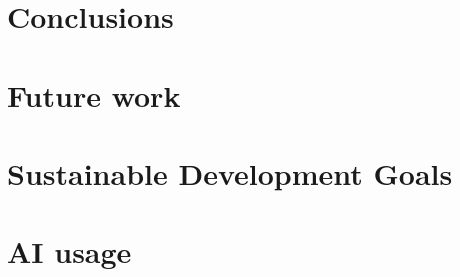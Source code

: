 \documentclass[11pt,english,listoffigures,listoftables, listofalgorithms]{tfgetsinf}
\begin{document}
\chapter{Conclusions}
\label{chap:conclusions}


\chapter{Future work}
\label{chap:future-work}


\nocite{*}
\printbibliography[heading=bibintoc]


\APPENDIX


\chapter{Sustainable Development Goals}
\label{app:sdg}


\chapter{AI usage}
\label{app:ai-usage}
\end{document}
